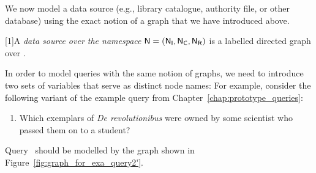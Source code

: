 We now model a data source (e.g., library catalogue, authority file, or other database)
using the exact notion of a graph that we have introduced above.
%
\begin{definition}
  \scalebox{0.973}[1]{A \emph{data source over the namespace $\textup{\textsf{N}}=(\mathsf{N}_\mathsf{I},\mathsf{N}_\mathsf{C},\mathsf{N}_\mathsf{R})$} is a labelled directed graph
  over \namespace.}
\end{definition}
%
%
In order to model queries with the same notion of graphs, we need to introduce
two sets of variables that serve as distinct node names:
For example, consider the following variant of the example query  from Chapter~\ref{chap:prototype_queries}:
%
\begin{enumerate}
  \item[\exaquery{2$'$}]
    Which exemplars of \emph{De revolutionibus} were owned by some scientist who passed them on to a student?
\end{enumerate}
%
Query~
should be modelled by the graph shown in Figure~\ref{fig:graph_for_exa_query2'}.


